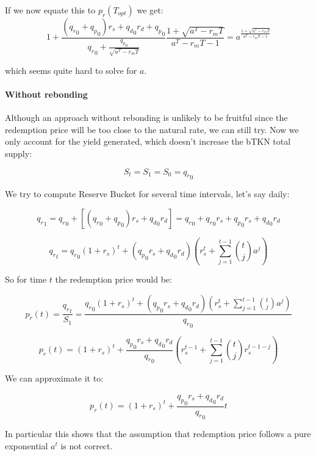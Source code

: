 \documentclass{article}
\begin{document}
If we now equate this to $p_r(T_{opt})$ we get:
\begin{equation}
  \label{}
1 + \frac{({q_r}_0 + {q_p}_0)r_s + {q_d}_0 r_d + {q_p}_0}{{q_r}_0 + \frac{{q_p}_0}{\sqrt{a^T - r_mT}}} \frac{1+ \sqrt{a^T - r_mT}}{a^T - r_mT - 1} = a ^{\frac{1+ \sqrt{a^T - r_mT}}{a^T - r_mT - 1}}
\end{equation}

which seems quite hard to solve for $a$.

\paragraph{Without rebonding}

Although an approach without rebonding is unlikely to be fruitful since the redemption price will be too close to the natural rate, we can still try. Now we only account for the yield generated, which doesn’t increase the bTKN total supply:

\[
S_t = S_1 = S_0 = {q_r}_0
\]

We try to compute Reserve Bucket for several time intervals, let’s say daily:

\[
{q_r}_1 = {q_r}_0 + [({q_r}_0 + {q_p}_0) r_s + {q_d}_0 r_d] = {q_r}_0 + {q_r}_0 r_s + {q_p}_0 r_s + {q_d}_0 r_d
\]

\[
{q_r}_t = {q_r}_0(1+r_s)^t + ({q_p}_0 r_s + {q_d}_0 r_d) \left(r_s^t + \sum_{j=1}^{t-1} \binom{t}{j} a^j \right)
\]

So for time $t$ the redemption price would be:

\[
p_r(t) = \frac{{q_r}_t}{S_1} = \frac{{q_r}_0(1+r_s)^t + ({q_p}_0 r_s + {q_d}_0 r_d) \left(r_s^t + \sum_{j=1}^{t-1} \binom{t}{j} a^j \right)}{{q_r}_0}
\]

\begin{equation}
  \label{eq:conservative_p_r_base_2_a}
p_r(t) = (1+r_s)^t + \frac{{q_p}_0 r_s + {q_d}_0 r_d}{{q_r}_0} \left(r_s^{t-1} + \sum_{j=1}^{t-1} \binom{t}{j} r_s^{t-1-j} \right)
\end{equation}

We can approximate it to:

\begin{equation}
  \label{eq:conservative_p_r_base_2_b}
p_r(t) = (1+r_s)^t + \frac{{q_p}_0 r_s + {q_d}_0 r_d}{{q_r}_0} t
\end{equation}

In particular this shows that the assumption that redemption price follows a pure exponential $a^t$ is not correct.
\end{document}
